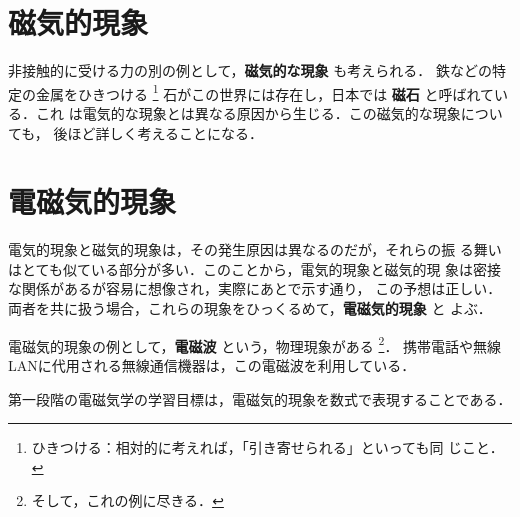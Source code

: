     \section{磁気的現象}
        非接触的に受ける力の別の例として，\textbf{磁気的な現象} も考えられる．
        鉄などの特定の金属をひきつける
            \footnote{
                ひきつける：相対的に考えれば，「引き寄せられる」といっても同
                じこと．
            }
        石がこの世界には存在し，日本では \textbf{磁石} と呼ばれている．これ
        は電気的な現象とは異なる原因から生じる．この磁気的な現象についても，
        後ほど詳しく考えることになる．

    \section{電磁気的現象}
        電気的現象と磁気的現象は，その発生原因は異なるのだが，それらの振
        る舞いはとても似ている部分が多い．このことから，電気的現象と磁気的現
        象は密接な関係があるが容易に想像され，実際にあとで示す通り，
        この予想は正しい．
        両者を共に扱う場合，これらの現象をひっくるめて，\textbf{電磁気的現象} と
        よぶ．

        電磁気的現象の例として，\textbf{電磁波} という，物理現象がある
            \footnote{
                そして，これの例に尽きる．
            }．
        携帯電話や無線LANに代用される無線通信機器は，この電磁波を利用している．

        第一段階の電磁気学の学習目標は，電磁気的現象を数式で表現することである．


